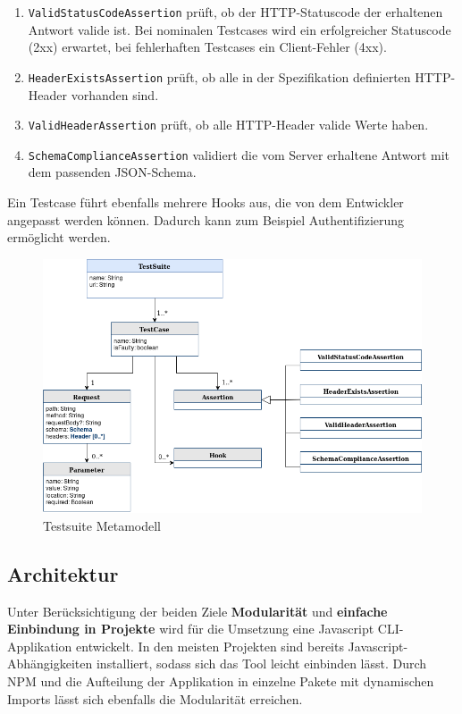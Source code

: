 \begin{enumerate}
	\item \lstinline|ValidStatusCodeAssertion| prüft, ob der HTTP-Statuscode der erhaltenen Antwort valide ist. Bei nominalen Testcases wird ein erfolgreicher Statuscode (2xx) erwartet, bei fehlerhaften Testcases ein Client-Fehler (4xx).
	\item \lstinline|HeaderExistsAssertion| prüft, ob alle in der Spezifikation definierten HTTP-Header vorhanden sind.
	\item \lstinline|ValidHeaderAssertion| prüft, ob alle HTTP-Header valide Werte haben.
	\item \lstinline|SchemaComplianceAssertion| validiert die vom Server erhaltene Antwort mit dem passenden JSON-Schema.
\end{enumerate}

Ein Testcase führt ebenfalls mehrere Hooks aus, die von dem Entwickler angepasst werden können. Dadurch kann zum Beispiel Authentifizierung ermöglicht werden.

\begin{figure}
\centering
  \includegraphics[width=\textwidth]{../images/testsuite.png}
  \caption{Testsuite Metamodell}
  \label{fig:testsuite}
\end{figure}



\subsection{Architektur}

Unter Berücksichtigung der beiden Ziele \textbf{Modularität} und \textbf{einfache Einbindung in Projekte} wird für die Umsetzung eine Javascript CLI-Applikation entwickelt. In den meisten Projekten sind bereits Javascript-Abhängigkeiten installiert, sodass sich das Tool leicht einbinden lässt. Durch NPM und die Aufteilung der Applikation in einzelne Pakete mit dynamischen Imports lässt sich ebenfalls die Modularität erreichen.\\

